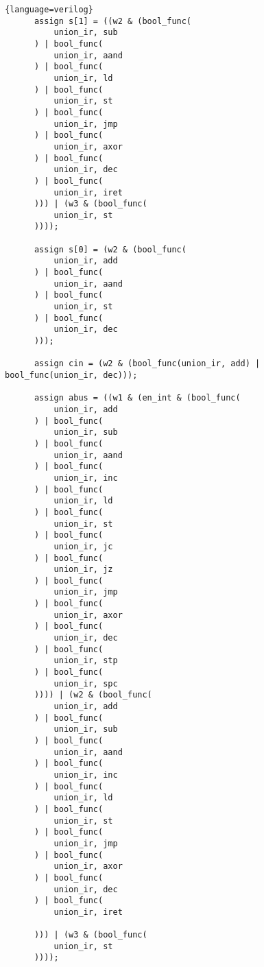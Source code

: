 \begin{lstlisting}{language=verilog}
      assign s[1] = ((w2 & (bool_func(
          union_ir, sub
      ) | bool_func(
          union_ir, aand
      ) | bool_func(
          union_ir, ld
      ) | bool_func(
          union_ir, st
      ) | bool_func(
          union_ir, jmp
      ) | bool_func(
          union_ir, axor
      ) | bool_func(
          union_ir, dec
      ) | bool_func(
          union_ir, iret
      ))) | (w3 & (bool_func(
          union_ir, st
      ))));
    
      assign s[0] = (w2 & (bool_func(
          union_ir, add
      ) | bool_func(
          union_ir, aand
      ) | bool_func(
          union_ir, st
      ) | bool_func(
          union_ir, dec
      )));
    
      assign cin = (w2 & (bool_func(union_ir, add) | bool_func(union_ir, dec)));
    
      assign abus = ((w1 & (en_int & (bool_func(
          union_ir, add
      ) | bool_func(
          union_ir, sub
      ) | bool_func(
          union_ir, aand
      ) | bool_func(
          union_ir, inc
      ) | bool_func(
          union_ir, ld
      ) | bool_func(
          union_ir, st
      ) | bool_func(
          union_ir, jc
      ) | bool_func(
          union_ir, jz
      ) | bool_func(
          union_ir, jmp
      ) | bool_func(
          union_ir, axor
      ) | bool_func(
          union_ir, dec
      ) | bool_func(
          union_ir, stp
      ) | bool_func(
          union_ir, spc
      )))) | (w2 & (bool_func(
          union_ir, add
      ) | bool_func(
          union_ir, sub
      ) | bool_func(
          union_ir, aand
      ) | bool_func(
          union_ir, inc
      ) | bool_func(
          union_ir, ld
      ) | bool_func(
          union_ir, st
      ) | bool_func(
          union_ir, jmp
      ) | bool_func(
          union_ir, axor
      ) | bool_func(
          union_ir, dec
      ) | bool_func(
          union_ir, iret
     
      ))) | (w3 & (bool_func(
          union_ir, st
      ))));
    

\end{lstlisting}
